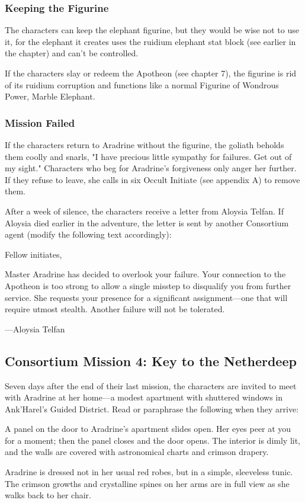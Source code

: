 \documentclass[10pt,a4paper,twoside,bg=print,twocolumn,openany,nodeprecatedcode]{dndbook}
\begin{document}
\subsubsection{Keeping the Figurine}
The characters can keep the elephant figurine, but they would be wise not to use it, for the elephant it creates uses the ruidium elephant stat block (see earlier in the chapter) and can't be controlled.

If the characters slay or redeem the Apotheon (see chapter 7), the figurine is rid of its ruidium corruption and functions like a normal Figurine of Wondrous Power, Marble Elephant.

\subsubsection{Mission Failed}
If the characters return to Aradrine without the figurine, the goliath beholds them coolly and snarls, "I have precious little sympathy for failures. Get out of my sight." Characters who beg for Aradrine's forgiveness only anger her further. If they refuse to leave, she calls in six Occult Initiate (see appendix A) to remove them.

After a week of silence, the characters receive a letter from Aloysia Telfan. If Aloysia died earlier in the adventure, the letter is sent by another Consortium agent (modify the following text accordingly):

\begin{DndReadAloud}{}
Fellow initiates,

Master Aradrine has decided to overlook your failure. Your connection to the Apotheon is too strong to allow a single misstep to disqualify you from further service. She requests your presence for a significant assignment—one that will require utmost stealth. Another failure will not be tolerated.

—Aloysia Telfan

\end{DndReadAloud}

\subsection{Consortium Mission 4: Key to the Netherdeep}
Seven days after the end of their last mission, the characters are invited to meet with Aradrine at her home—a modest apartment with shuttered windows in Ank'Harel's Guided District. Read or paraphrase the following when they arrive:

\begin{DndReadAloud}{}
A panel on the door to Aradrine's apartment slides open. Her eyes peer at you for a moment; then the panel closes and the door opens. The interior is dimly lit, and the walls are covered with astronomical charts and crimson drapery.

Aradrine is dressed not in her usual red robes, but in a simple, sleeveless tunic. The crimson growths and crystalline spines on her arms are in full view as she walks back to her chair.

\end{DndReadAloud}
\end{document}
